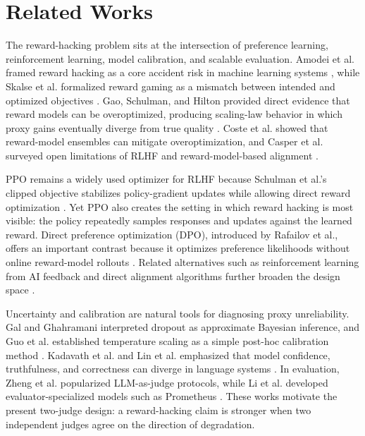 \documentclass[11pt]{article}
\begin{document}
\section{Related Works}
The reward-hacking problem sits at the intersection of preference learning, reinforcement learning, model calibration, and scalable evaluation. Amodei et al. framed reward hacking as a core accident risk in machine learning systems \cite{amodei2016concrete}, while Skalse et al. formalized reward gaming as a mismatch between intended and optimized objectives \cite{skalse2022defining}. Gao, Schulman, and Hilton provided direct evidence that reward models can be overoptimized, producing scaling-law behavior in which proxy gains eventually diverge from true quality \cite{gao2023scaling}. Coste et al. showed that reward-model ensembles can mitigate overoptimization, and Casper et al. surveyed open limitations of RLHF and reward-model-based alignment \cite{coste2023reward,casper2023open}.

PPO remains a widely used optimizer for RLHF because Schulman et al.'s clipped objective stabilizes policy-gradient updates while allowing direct reward optimization \cite{schulman2017proximal}. Yet PPO also creates the setting in which reward hacking is most visible: the policy repeatedly samples responses and updates against the learned reward. Direct preference optimization (DPO), introduced by Rafailov et al., offers an important contrast because it optimizes preference likelihoods without online reward-model rollouts \cite{rafailov2023direct}. Related alternatives such as reinforcement learning from AI feedback and direct alignment algorithms further broaden the design space \cite{lee2023rlaif,azarruss2024kto}.

Uncertainty and calibration are natural tools for diagnosing proxy unreliability. Gal and Ghahramani interpreted dropout as approximate Bayesian inference, and Guo et al. established temperature scaling as a simple post-hoc calibration method \cite{gal2016dropout,guo2017calibration}. Kadavath et al. and Lin et al. emphasized that model confidence, truthfulness, and correctness can diverge in language systems \cite{kadavath2022language,lin2022truthfulqa}. In evaluation, Zheng et al. popularized LLM-as-judge protocols, while Li et al. developed evaluator-specialized models such as Prometheus \cite{zheng2023judging,li2024prometheus}. These works motivate the present two-judge design: a reward-hacking claim is stronger when two independent judges agree on the direction of degradation.
\end{document}
